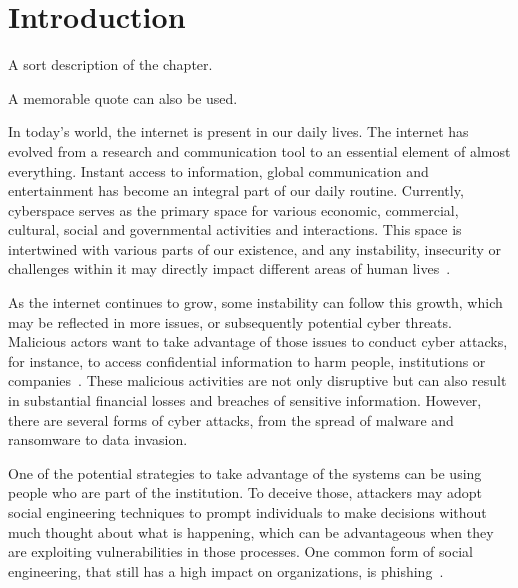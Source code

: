 \chapter{Introduction}
\label{chapter:introduction}

\begin{introduction}
A sort description of the chapter.

A memorable quote can also be used.
\end{introduction}





In today's world, the internet is present in our daily lives. The internet has evolved from a research and communication tool to an essential element of almost everything. Instant access to information, global communication and entertainment has become an integral part of our daily routine. Currently, cyberspace serves as the primary space for various economic, commercial, cultural, social and governmental activities and interactions. This space is intertwined with various parts of our existence, and any instability, insecurity or challenges within it may directly impact different areas of human lives~\cite{li2021comprehensive}. 

As the internet continues to grow, some instability can follow this growth, which may be reflected in more issues, or subsequently potential cyber threats. Malicious actors want to take advantage of those issues to conduct cyber attacks, for instance, to access confidential information to harm people, institutions or companies~\cite{}. These malicious activities are not only disruptive but can also result in substantial financial losses and breaches of sensitive information. However, there are several forms of cyber attacks, from the spread of malware and ransomware to data invasion.

One of the potential strategies to take advantage of the systems can be using people who are part of the institution. To deceive those, attackers may adopt social engineering techniques to prompt individuals to make decisions without much thought about what is happening, which can be advantageous when they are exploiting vulnerabilities in those processes. One common form of social engineering, that still has a high impact on organizations, is phishing~\cite{cisa2023cyberattacks}.

